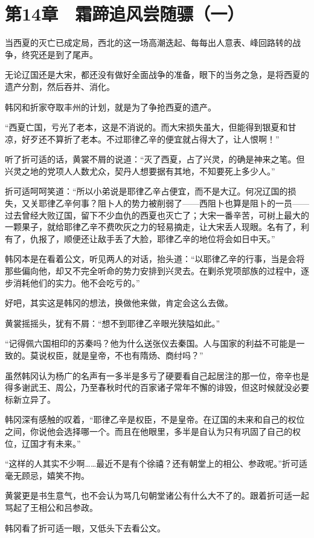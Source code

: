 \section{第14章　霜蹄追风尝随骠（一）}

当西夏的灭亡已成定局，西北的这一场高潮迭起、每每出人意表、峰回路转的战争，终究还是到了尾声。

无论辽国还是大宋，都还没有做好全面战争的准备，眼下的当务之急，是将西夏的遗产分割，然后吞并、消化。

韩冈和折家夺取丰州的计划，就是为了争抢西夏的遗产。

“西夏亡国，亏光了老本，这是不消说的。而大宋损失虽大，但能得到银夏和甘凉，好歹还不算折了老本。不过耶律乙辛的便宜就占得大了，让人恨啊！”

听了折可适的话，黄裳不屑的说道：“灭了西夏，占了兴灵，的确是神来之笔。但兴灵之地的党项人人数尤众，契丹人想要据有其地，不知要死上多少人。”

折可适呵呵笑道：“所以小弟说是耶律乙辛占便宜，而不是大辽。何况辽国的损失，又关耶律乙辛何事？阻卜人的势力被削弱了——西阻卜也算是阻卜的一员——过去曾经大败辽国，留下不少血仇的西夏也灭亡了；大宋一番辛苦，可树上最大的一颗果子，就给耶律乙辛不费吹灰之力的轻易摘走，让大宋丢人现眼。名有了，利有了，仇报了，顺便还让敌手丢了大脸，耶律乙辛的地位将会如日中天。”

韩冈本是在看着公文，听见两人的对话，抬头道：“以耶律乙辛的行事，当是会将那些偏向他，却又不完全听命的势力安排到兴灵去。在剿杀党项部族的过程中，逐步消耗他们的实力。他不会吃亏的。”

好吧，其实这是韩冈的想法，换做他来做，肯定会这么去做。

黄裳摇摇头，犹有不屑：“想不到耶律乙辛眼光狭隘如此。”

“记得佩六国相印的苏秦吗？他为什么送张仪去秦国。人与国家的利益不可能是一致的。莫说权臣，就是皇帝，不也有隋炀、商纣吗？”

虽然韩冈认为杨广的名声有一多半是多亏了硬要看自己起居注的那一位，帝辛也是得多谢武王、周公，乃至春秋时代的百家诸子常年不懈的诽毁，但这时候就没必要标新立异了。

韩冈深有感触的叹着，“耶律乙辛是权臣，不是皇帝。在辽国的未来和自己的权位之间，你说他会选择哪一个。而且在他眼里，多半是自认为只有巩固了自己的权位，辽国才有未来。”

“这样的人其实不少啊……最近不是有个徐禧？还有朝堂上的相公、参政呢。”折可适毫无顾忌，嬉笑不拘。

黄裳更是书生意气，也不会认为骂几句朝堂诸公有什么大不了的。跟着折可适一起骂起了王相公和吕参政。

韩冈看了折可适一眼，又低头下去看公文。

